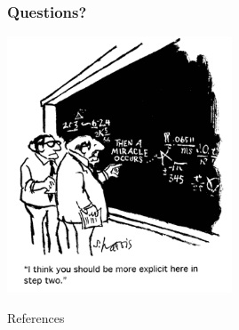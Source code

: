 \documentclass{beamer}
\renewcommand{\(}{\begin{columns}}
\renewcommand{\)}{\end{columns}}
\newcommand{\<}[1]{\begin{column}{#1}}
\renewcommand{\>}{\end{column}}
\begin{document}
\section*{}
\begin{frame}[fragile]
  \frametitle{Questions?}
  \begin{center}
  \includegraphics[height=3in,clip]{../questions-comic}  
  \end{center}
  
\end{frame}

\begin{frame}{References}
	
	
\end{frame}
\end{document}
